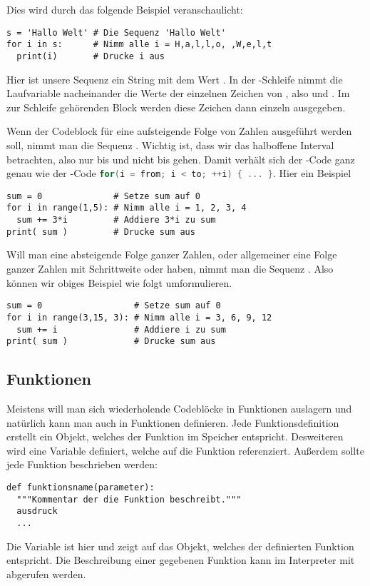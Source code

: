 Dies wird durch das folgende Beispiel veranschaulicht:
\begin{lstlisting}
s = 'Hallo Welt' # Die Sequenz 'Hallo Welt'
for i in s:      # Nimm alle i = H,a,l,l,o, ,W,e,l,t
  print(i)       # Drucke i aus
\end{lstlisting}
Hier ist unsere Sequenz  ein String mit dem Wert . In der -Schleife nimmt die Laufvariable nacheinander
die Werte der einzelnen Zeichen von , also   und . Im zur Schleife gehörenden Block werden 
diese Zeichen dann einzeln ausgegeben.

Wenn der Codeblock für eine aufsteigende Folge von Zahlen  ausgeführt werden soll, nimmt man die Sequenz .
Wichtig ist, dass wir das halboffene Interval betrachten, also nur bis  und nicht bis  gehen.
Damit verhält sich der \Python-Code  ganz genau wie der \CC-Code \lstinline[language=C++,style=CPPinline]|for(i = from; i < to; ++i) { ... }|.
Hier ein Beispiel
\begin{lstlisting}
sum = 0              # Setze sum auf 0
for i in range(1,5): # Nimm alle i = 1, 2, 3, 4
  sum += 3*i         # Addiere 3*i zu sum
print( sum )         # Drucke sum aus
\end{lstlisting}

Will man eine absteigende Folge ganzer Zahlen, oder allgemeiner eine Folge ganzer Zahlen mit Schrittweite  oder  haben,
nimmt man die Sequenz .
Also können wir obiges Beispiel wie folgt umformulieren.
\begin{lstlisting}
sum = 0                  # Setze sum auf 0
for i in range(3,15, 3): # Nimm alle i = 3, 6, 9, 12
  sum += i               # Addiere i zu sum
print( sum )             # Drucke sum aus
\end{lstlisting}


\subsection{Funktionen}
\label{section:crashkurs:funktionen}
Meistens will man sich wiederholende Codeblöcke in Funktionen auslagern und natürlich kann man auch in \Python Funktionen definieren.
Jede Funktionsdefinition erstellt ein Objekt, welches der Funktion im Speicher entspricht.
Desweiteren wird eine Variable definiert, welche auf die Funktion referenziert.
Außerdem sollte jede Funktion beschrieben werden:
\begin{lstlisting}
def funktionsname(parameter):
  """Kommentar der die Funktion beschreibt."""
  ausdruck
  ...
\end{lstlisting}
Die Variable ist hier  und zeigt auf das Objekt, welches der definierten Funktion entspricht.
Die Beschreibung einer gegebenen Funktion  kann im Interpreter mit  abgerufen werden.

